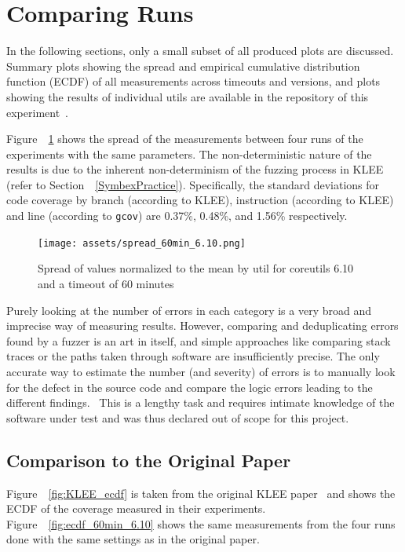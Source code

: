 \documentclass{article}
\let\savedCite=\cite
\renewcommand{\cite}{\unskip~\savedCite}
\let\savedRef=\ref
\renewcommand{\ref}{\unskip~\savedRef}
\begin{document}
\section{Comparing Runs}
\label{Timeouts}

In the following sections, only a small subset of all produced plots are discussed. Summary plots showing the spread and empirical cumulative distribution function (ECDF) of all measurements across timeouts and versions, and plots showing the results of individual utils are available in the repository of this experiment\cite{GitHub}.

Figure~\ref{fig:spread_60min_6.10} shows the spread of the measurements between four runs of the experiments with the same parameters. The non-deterministic nature of the results is due to the inherent non-determinism of the fuzzing process in KLEE (refer to Section~\ref{SymbexPractice}). Specifically, the standard deviations for code coverage by branch (according to KLEE), instruction (according to KLEE) and line (according to \lstinline{gcov}) are 0.37\%, 0.48\%, and 1.56\% respectively.

\begin{figure}[htbp]
    \centering
    \texttt{[image: assets/spread\_60min\_6.10.png]}
    \caption{Spread of values normalized to the mean by util for coreutils 6.10 and a timeout of 60 minutes}
    \label{fig:spread_60min_6.10}
\end{figure}

Purely looking at the number of errors in each category is a very broad and imprecise way of measuring results. However, comparing and deduplicating errors found by a fuzzer is an art in itself, and simple approaches like comparing stack traces or the paths taken through software are insufficiently precise. The only accurate way to estimate the number (and severity) of errors is to manually look for the defect in the source code and compare the logic errors leading to the different findings.\cite{EvaluatingFuzzTesting} This is a lengthy task and requires intimate knowledge of the software under test and was thus declared out of scope for this project.

\subsection{Comparison to the Original Paper}

Figure~\ref{fig:KLEE_ecdf} is taken from the original KLEE paper\cite{KLEE} and shows the ECDF of the coverage measured in their experiments. Figure~\ref{fig:ecdf_60min_6.10} shows the same measurements from the four runs done with the same settings as in the original paper.
\end{document}
